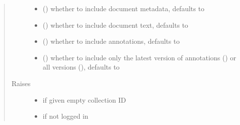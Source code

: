 \documentclass[letterpaper,10pt,english]{sphinxmanual}
\begin{document}
\begin{fulllineitems}
\begin{fulllineitems}
\begin{quote}
\begin{description}
\begin{itemize}
\item {} 
\sphinxAtStartPar
{} () \textendash{} whether to include document metadata, defaults to 

\item {} 
\sphinxAtStartPar
{} () \textendash{} whether to include document text, defaults to 

\item {} 
\sphinxAtStartPar
{} () \textendash{} whether to include annotations, defaults to 

\item {} 
\sphinxAtStartPar
{} () \textendash{} whether to include only the latest version
of annotations () or all versions (), defaults to 

\end{itemize}

\item[{Raises}] \leavevmode\begin{itemize}
\item {} 
\sphinxAtStartPar
{\hyperref[\detokenize{autoapi/pine/client/exceptions/index:pine.client.exceptions.PineClientValueException}]{}} \textendash{} if given empty collection ID

\item {} 
\sphinxAtStartPar
{\hyperref[\detokenize{autoapi/pine/client/exceptions/index:pine.client.exceptions.PineClientAuthException}]{}} \textendash{} if not logged in


\end{itemize}
\end{description}
\end{quote}
\end{fulllineitems}
\end{fulllineitems}
\end{document}
